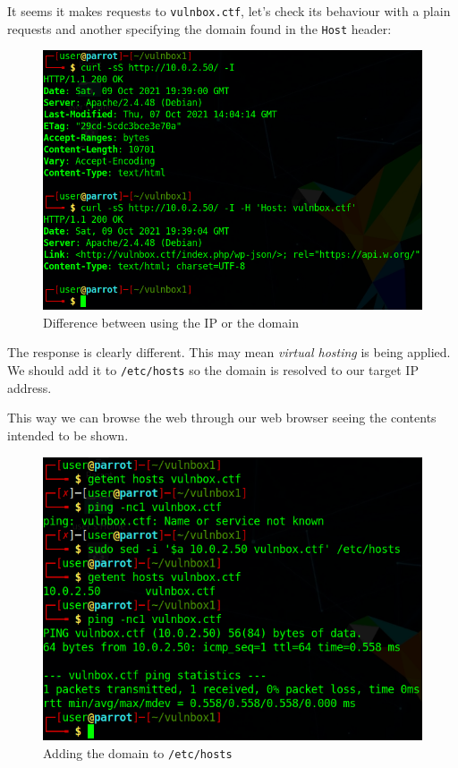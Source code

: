 \documentclass[12pt]{article}
\begin{document}
    It seems it makes requests to \texttt{vulnbox.ctf}, let's check its
    behaviour with a plain requests and another specifying the domain found in
    the \texttt{Host} header:

    \begin{figure}[H]\label{pic:10-curl-host}
        \centering
        \includegraphics[width=1.00\textwidth]{10-curl-host.png}
        \caption{Difference between using the IP or the domain}
    \end{figure}

    The response is clearly different. This may mean \textit{virtual hosting}
    is being applied. We should add it to \texttt{/etc/hosts} so the domain is
    resolved to our target IP address.

    This way we can browse the web through our web browser seeing the contents
    intended to be shown.

    \begin{figure}[H]\label{pic:11-getent}
        \centering
        \includegraphics[width=1.00\textwidth]{11-getent.png}
        \caption{Adding the domain to \texttt{/etc/hosts}}
    \end{figure}
\end{document}
